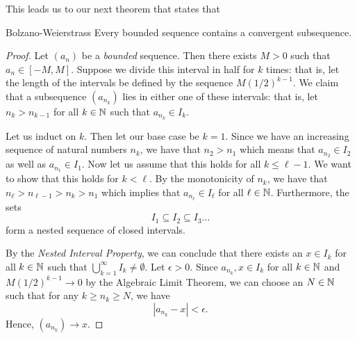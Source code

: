 This leads us to our next theorem that states that
\begin{theorem}{Bolzano-Weierstrass}{}
        Every bounded sequence contains a convergent subsequence.
\end{theorem}%

\begin{proof}
    Let \( (a_n)\) be a \textit{bounded} sequence. Then there exists \( M > 0 \) such that \( a_n \in [-M,M ]\). Suppose we divide this interval in half for \( k \) times: that is, let the length of the intervals be defined by the sequence \( M (1/2)^{k-1}\). We claim that a subsequence \( (a_{n_k})\) lies in either one of these intervals: that is, let \( n_{k} > n_{k-1}\) for all \( k \in \mathbb{N} \) such that \( a_{n_k} \in I_k\). 

    Let us induct on \( k\). Then let our base case be \( k = 1 \). Since we have an increasing sequence of natural numbers \( n_k\), we have that \( n_2 > n_1 \) which means that \( a_{n_2} \in I_2\) as well as \( a_{n_1} \in I_1\). Now let us assume that this holds for all \( k \leq \ell - 1 \). We want to show that this holds for \( k < \ell \). By the monotonicity of \( n_k \), we have that \( n_{\ell} > n_{\ell - 1} > n_k > n_1\) which implies that \( a_{n_\ell} \in I_\ell\) for all \( \ell \in \mathbb{N} \). Furthermore, the sets 
    \[ I_1 \subseteq I_2 \subseteq I_3 ...\]
form a nested sequence of closed intervals.

    By the \textit{Nested Interval Property}, we can conclude that there exists an \( x \in I_k\) for all \( k \in \mathbb{N} \)  such that \( \bigcup_{k=1}^{ \infty} I_k \neq \emptyset\). Let \( \epsilon > 0  \). Since \( a_{n_k}, x \in I_k \) for all \( k \in \mathbb{N} \) and \( M (1/2)^{k-1} \to 0\) by the Algebraic Limit Theorem, we can choose an \( N \in \mathbb{N} \) such that for any \( k \geq n_k \geq N \), we have
    \[ |a_{n_k} - x | < \epsilon.\] 
    Hence, \( (a_{n_k}) \to x \).
\end{proof}%




